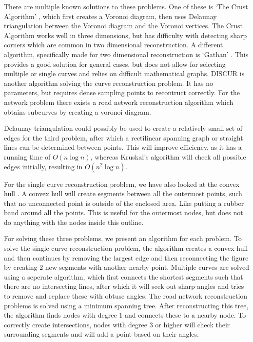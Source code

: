 \documentclass[11pt]{article}
\begin{document}
There are multiple known solutions to these problems. One of these is `The Crust Algorithm' \cite{crust}, which first creates a Voronoi diagram, then uses Delaunay triangulation between the Voronoi diagram and the Voronoi vertices. The Crust Algorithm works well in three dimensions, but has difficulty with detecting sharp corners which are common in two dimensional reconstruction.
A different algorithm, specifically made for two dimensional reconstruction is `Gathan' \cite{gathan}. This provides a good solution for general cases, but does not allow for selecting multiple or single curves and relies on difficult mathematical graphs.
DISCUR \cite{discur} is another algorithm solving the curve reconstruction problem. It has no parameters, but requires dense sampling points to recontruct correctly.
For the network problem there exists a road network reconstruction algorithm \cite{chen} which obtains subcurves by creating a voronoi diagram.

Delaunay triangulation could possibly be used to create a relatively small set of edges for the third problem, after which a rectilinear spanning graph or straight lines can be determined between points. This will improve efficiency, as it has a running time of $O(n \log{n})$, whereas Kruskal's algorithm will check all possible edges initially, resulting in $O(n^2 \log{n})$.

For the single curve reconstruction problem, we have also looked at the convex hull \cite{convex}. A convex hull will create segments between all the outermost points, such that no unconnected point is outside of the enclosed area. Like putting a rubber band around all the points. This is useful for the outermost nodes, but does not do anything with the nodes inside this outline.

For solving these three problems, we present an algorithm for each problem.
To solve the single curve reconstruction problem, the algorithm creates a convex hull and then continues by removing the largest edge and then reconnecting the figure by creating 2 new segments with another nearby point.
Multiple curves are solved using a seperate algorithm, which first connects the shortest segments such that there are no intersecting lines, after which it will seek out sharp angles and tries to remove and replace these with obtuse angles.
The road network reconstruction problems is solved using a minimum spanning tree. After reconstructing this tree, the algorithm finds nodes with degree 1 and connects these to a nearby node. To correctly create intersections, nodes with degree 3 or higher will check their surrounding segments and will add a point based on their angles.
\end{document}
